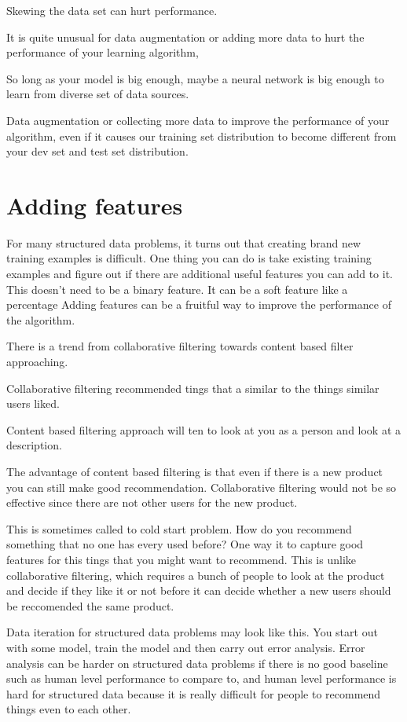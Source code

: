 Skewing the data set can hurt performance.

It is quite unusual for data augmentation or adding more data to hurt the performance of your learning algorithm,

So long as your model is big enough, maybe a neural network is big enough to learn from diverse set of data sources.

Data augmentation or collecting more data to improve the performance of your algorithm, even if it causes our training set distribution to become different from your dev set and test set distribution.

\section{Adding features}

For many structured data problems, it turns out that creating brand new training examples is difficult.
One thing you can do is take existing training examples and figure out if there are additional useful features you can add to it.
This doesn't need to be a binary feature.
It can be a soft feature like a percentage
Adding features can be a fruitful way to improve the performance of the algorithm.


There is a trend from collaborative filtering towards content based filter approaching.


Collaborative filtering recommended tings that a similar to the things similar users liked.

Content based filtering approach will ten to look at you as a person and look at a description.

The advantage of content based filtering is that even if there is a new product you can still make good recommendation.
Collaborative filtering would not be so effective since there are not other users for the new product.

This is sometimes called to cold start problem.
How do you recommend something that no one has every used before?
One way it to capture good features for this tings that you might want to recommend.
This is unlike collaborative filtering, which requires a bunch of people to look at the product and decide if they like it or not before it can decide whether a new users should be reccomended the same product.


Data iteration for structured data problems may look like this.
You start out with some model, train the model and then carry out error analysis.
Error analysis can be harder on structured data problems if there is no good baseline such as human level performance to compare to, and human level performance is hard for structured data because it is really difficult for people to recommend things even to each other.

